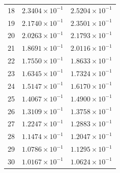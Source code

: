 \begin{table}[H]
\begin{tabular}{@{}rrr@{}}
18 & $2.3404\times10^{-1}$ & $2.5204\times10^{-1}$\\
19 & $2.1740\times10^{-1}$ & $2.3501\times10^{-1}$\\
20 & $2.0263\times10^{-1}$ & $2.1793\times10^{-1}$\\
21 & $1.8691\times10^{-1}$ & $2.0116\times10^{-1}$\\
22 & $1.7550\times10^{-1}$ & $1.8633\times10^{-1}$\\
23 & $1.6345\times10^{-1}$ & $1.7324\times10^{-1}$\\
24 & $1.5147\times10^{-1}$ & $1.6170\times10^{-1}$\\
25 & $1.4067\times10^{-1}$ & $1.4900\times10^{-1}$\\
26 & $1.3109\times10^{-1}$ & $1.3758\times10^{-1}$\\
27 & $1.2247\times10^{-1}$ & $1.2883\times10^{-1}$\\
28 & $1.1474\times10^{-1}$ & $1.2047\times10^{-1}$\\
29 & $1.0786\times10^{-1}$ & $1.1295\times10^{-1}$\\
30 & $1.0167\times10^{-1}$ & $1.0624\times10^{-1}$\\
\bottomrule
\end{tabular}
\end{table}

